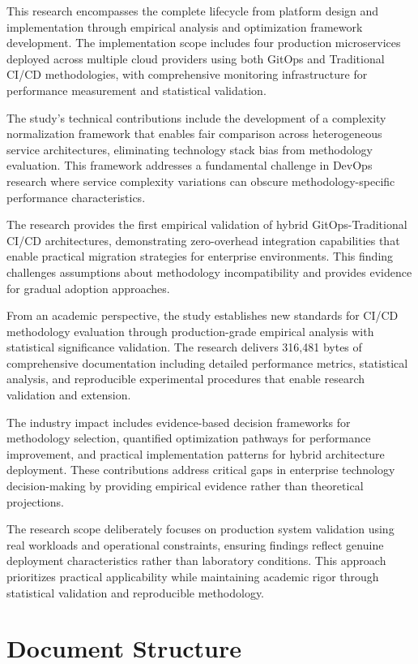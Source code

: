This research encompasses the complete lifecycle from platform design and implementation through empirical analysis and optimization framework development. The implementation scope includes four production microservices deployed across multiple cloud providers using both GitOps and Traditional CI/CD methodologies, with comprehensive monitoring infrastructure for performance measurement and statistical validation.

The study's technical contributions include the development of a complexity normalization framework that enables fair comparison across heterogeneous service architectures, eliminating technology stack bias from methodology evaluation. This framework addresses a fundamental challenge in DevOps research where service complexity variations can obscure methodology-specific performance characteristics.

The research provides the first empirical validation of hybrid GitOps-Traditional CI/CD architectures, demonstrating zero-overhead integration capabilities that enable practical migration strategies for enterprise environments. This finding challenges assumptions about methodology incompatibility and provides evidence for gradual adoption approaches.

From an academic perspective, the study establishes new standards for CI/CD methodology evaluation through production-grade empirical analysis with statistical significance validation. The research delivers 316,481 bytes of comprehensive documentation including detailed performance metrics, statistical analysis, and reproducible experimental procedures that enable research validation and extension.

The industry impact includes evidence-based decision frameworks for methodology selection, quantified optimization pathways for performance improvement, and practical implementation patterns for hybrid architecture deployment. These contributions address critical gaps in enterprise technology decision-making by providing empirical evidence rather than theoretical projections.

The research scope deliberately focuses on production system validation using real workloads and operational constraints, ensuring findings reflect genuine deployment characteristics rather than laboratory conditions. This approach prioritizes practical applicability while maintaining academic rigor through statistical validation and reproducible methodology.

\section{Document Structure}

